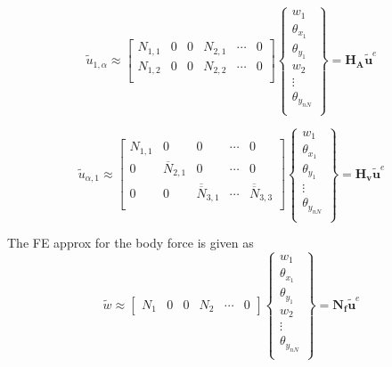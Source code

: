 \documentclass[9pt]{beamer}
\begin{document}
\begin{frame}

\begin{equation*}
\tilde{u}_{1, \alpha} \approx 
\begin{bmatrix}
{N}_{1,1} & 0 & 0 &{N}_{2,1} & \cdots & 0 \\
{N}_{1,2} & 0 & 0 &{N}_{2,2} & \cdots & 0 \\ 
\end{bmatrix} 
\left\{
\begin{array}{r}
w_1 \\
\theta_{x_1} \\
\theta_{y_1} \\
w_{2} \\
\vdots \\
\theta_{y_{nN}} \\
\end{array} \right\}=\mathbf{ H_A }\tilde{\mathbf{u}}^e
\end{equation*}

\begin{equation*}
\tilde{u}_{\alpha, 1} \approx 
\begin{bmatrix}
{N}_{1,1} & 0 & 0 & \cdots & 0 \\
0 & \overline{N}_{2,1} & 0 & \cdots & 0 \\ 
0 & 0 & \overline{\overline{N}}_{3,1} & \cdots & \overline{\overline{N}}_{3,3} \\ 
\end{bmatrix} 
\left\{
\begin{array}{r}
w_1 \\
\theta_{x_1} \\
\theta_{y_1} \\
\vdots \\
\theta_{y_{nN}} \\
\end{array} \right\}=\mathbf{ H_v }\tilde{\mathbf{u}}^e
\end{equation*}



The FE approx for the body force is given as
\begin{equation*}
\tilde{w} \approx 
\begin{bmatrix}
{N}_{1} & 0 & 0 &{N}_{2} &\cdots & 0 
\end{bmatrix} 
\left\{
\begin{array}{r}
w_1 \\
\theta_{x_1} \\
\theta_{y_1} \\
w_2 \\
\vdots \\
\theta_{y_{nN}} \\
\end{array} \right\}=\mathbf{ N_f }\tilde{\mathbf{u}}^e
\end{equation*}
\end{frame}
\end{document}
